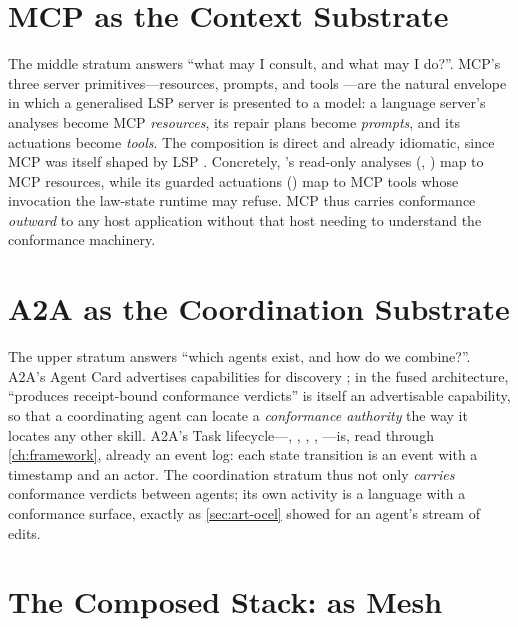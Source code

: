 \section{MCP as the Context Substrate}
\label{sec:fus-mcp}

The middle stratum answers ``what may I consult, and what may I do?''. MCP's three
server primitives---resources, prompts, and tools \citep{mcp-spec-2025}---are the
natural envelope in which a generalised LSP server is presented to a model: a
language server's analyses become MCP \emph{resources}, its repair plans become
\emph{prompts}, and its actuations become \emph{tools}. The composition is
direct and already idiomatic, since MCP was itself shaped by LSP
\citep{mcp-spec-2025}. Concretely, \lspmax's read-only analyses (,
) map to MCP resources, while its guarded actuations
() map to MCP tools whose invocation the law-state runtime
may refuse. MCP thus carries conformance \emph{outward} to any host application
without that host needing to understand the conformance machinery.

\section{A2A as the Coordination Substrate}
\label{sec:fus-a2a}

The upper stratum answers ``which agents exist, and how do we combine?''. A2A's
Agent Card advertises capabilities for discovery \citep{a2a-spec,a2a-discovery};
in the fused architecture, ``produces receipt-bound conformance verdicts'' is
itself an advertisable capability, so that a coordinating agent can locate a
\emph{conformance authority} the way it locates any other skill. A2A's Task
lifecycle---, , ,
, ---is, read through \cref{ch:framework}, already an
event log: each state transition is an event with a timestamp and an actor. The
coordination stratum thus not only \emph{carries} conformance verdicts between
agents; its own activity is a language with a conformance surface, exactly as
\cref{sec:art-ocel} showed for an agent's stream of edits.

\section{The Composed Stack: \texorpdfstring{\lspmax}{lsp-max} as Mesh}
\label{sec:fus-stack}

